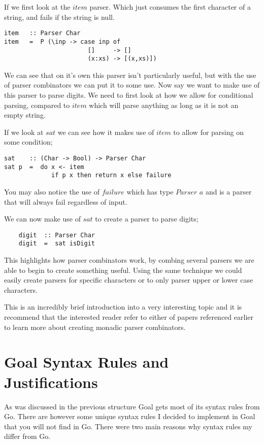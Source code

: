 If we first look at the $item$ parser. Which just consumes the first character of a string, and fails if the string is null. 

\newpage

\begin{lstlisting}
item   :: Parser Char
item   =  P (\inp -> case inp of
                       []     -> []
                       (x:xs) -> [(x,xs)])
\end{lstlisting}

We can see that on it's own this parser isn't particularly useful, but with the use of parser combinators we can put it to some use. Now say we want to make use of this parser to parse digits. We need to first look at how we allow for conditional parsing, compared to $item$ which will parse anything as long as it is not an empty string. 

If we look at $sat$ we can see how it makes use of $item$ to allow for parsing on some condition;

\begin{lstlisting}
sat    :: (Char -> Bool) -> Parser Char
sat p  =  do x <- item
             if p x then return x else failure
\end{lstlisting}

You may also notice the use of $failure$ which has type  $Parser$ $a$ and is a parser that will always fail regardless of input. 

We can now make use of $sat$ to create a parser to parse digits;

\begin{lstlisting}
	digit  :: Parser Char
	digit  =  sat isDigit
\end{lstlisting}

This highlights how parser combinators work, by combing several parsers we are able to begin to create something useful. Using the same technique we could easily create parsers for specific characters or to only parser upper or lower case characters.

This is an incredibly brief introduction into a very interesting topic and it is recommend that the interested reader refer to either of papers referenced earlier to learn more about creating monadic parser combinators.

\section{Goal Syntax Rules and Justifications}

As was discussed in the previous structure Goal gets most of its syntax rules from Go. There are however some unique syntax rules I decided to implement in Goal that you will not find in Go. There were two main reasons why syntax rules my differ from Go. 

